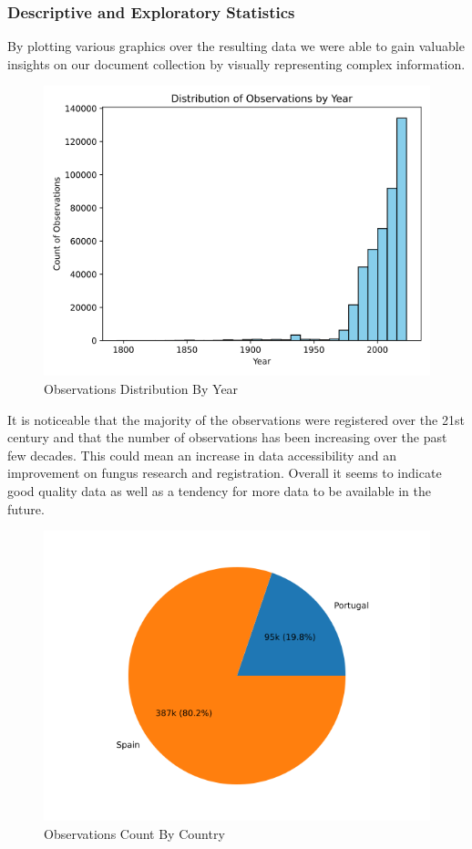 \subsubsection{\textbf{Descriptive and Exploratory Statistics}}

By plotting various graphics over the resulting data we were able to gain valuable insights on our document collection by visually representing complex information.

\begin{figure}[H]
    \centering
    \includegraphics[width=0.6\linewidth]{figures/observation_distribution_by_year.png}
    \caption{Observations Distribution By Year}
\end{figure}

It is noticeable that the majority of the observations were registered over the 21st century and that the number of observations has been increasing over the past few decades. This could mean an increase in data accessibility and an improvement on fungus research and registration. Overall it seems to indicate good quality data as well as a tendency for more data to be available in the future.

\begin{figure}[H]
    \centering
    \includegraphics[width=0.6\linewidth]{figures/observation_distribution_by_country.png}
    \caption{Observations Count By Country}
\end{figure}

